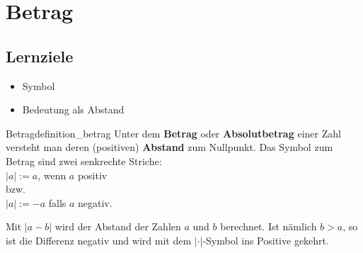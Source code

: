 
\section{Betrag}


\subsection*{Lernziele}

\begin{itemize}
  \item Symbol
  \item Bedeutung als Abstand
\end{itemize}


%
%





\begin{definition}{Betrag}{definition_betrag}
  Unter dem \textbf{Betrag} oder \textbf{Absolutbetrag} einer Zahl versteht man deren (positiven)
  \textbf{Abstand} zum Nullpunkt. Das Symbol zum Betrag sind zwei
  senkrechte Striche:\\
  $|a| := a$, wenn $a$ positiv\\
  bzw.\\
  $|a| := -a$ falls $a$ negativ.
\end{definition}
\newpage


\begin{bemerkung}{}{}
Mit $|a - b|$ wird der Abstand der Zahlen $a$ und $b$ berechnet. Ist
nämlich $b > a$, so ist die Differenz negativ und wird mit dem
$| \cdot{} |$-Symbol ins Positive gekehrt.
\end{bemerkung}

